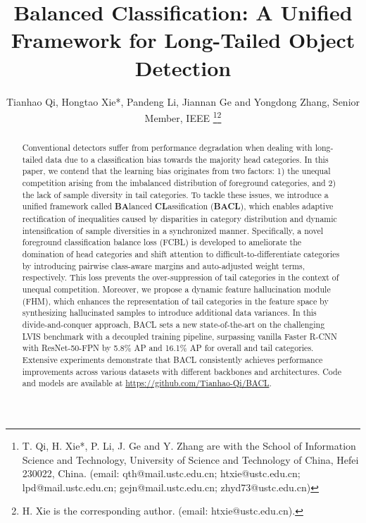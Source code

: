 \documentclass[lettersize,journal]{IEEEtran}
\begin{document}
\title{Balanced Classification: A Unified Framework for Long-Tailed Object Detection}

\author{Tianhao Qi, Hongtao Xie*, Pandeng Li, Jiannan Ge and Yongdong Zhang, Senior Member, IEEE
\thanks{T. Qi, H. Xie*, P. Li, J. Ge and Y. Zhang are with the School of Information Science and Technology, University of Science and Technology of China, Hefei 230022, China. (email: qth@mail.ustc.edu.cn; htxie@ustc.edu.cn; lpd@mail.ustc.edu.cn; gejn@mail.ustc.edu.cn; zhyd73@ustc.edu.cn)}\thanks{H. Xie is the corresponding author. (email: htxie@ustc.edu.cn).}}




\maketitle

\begin{abstract}
  Conventional detectors suffer from performance degradation when dealing with long-tailed data due to a classification bias towards the majority head categories.
  In this paper, we contend that the learning bias originates from two factors: 1) the unequal competition arising from the imbalanced distribution of foreground categories, and 2) the lack of sample diversity in tail categories.
  To tackle these issues, we introduce a unified framework called \textbf{BA}lanced \textbf{CL}assification (\textbf{BACL}), which enables adaptive rectification of inequalities caused by disparities in category distribution and dynamic intensification of sample diversities in a synchronized manner.
  Specifically, a novel foreground classification balance loss (FCBL) is developed to ameliorate the domination of head categories and shift attention to difficult-to-differentiate categories by introducing pairwise class-aware margins and auto-adjusted weight terms, respectively.
  This loss prevents the over-suppression of tail categories in the context of unequal competition.
  Moreover, we propose a dynamic feature hallucination module (FHM), which enhances the representation of tail categories in the feature space by synthesizing hallucinated samples to introduce additional data variances.
  In this divide-and-conquer approach, BACL sets a new state-of-the-art on the challenging LVIS benchmark with a decoupled training pipeline, surpassing vanilla Faster R-CNN with ResNet-50-FPN by 5.8\% AP and 16.1\% AP for overall and tail categories.
  Extensive experiments demonstrate that BACL consistently achieves performance improvements across various datasets with different backbones and architectures.
  Code and models are available at \url{https://github.com/Tianhao-Qi/BACL}.
\end{abstract}
\end{document}
